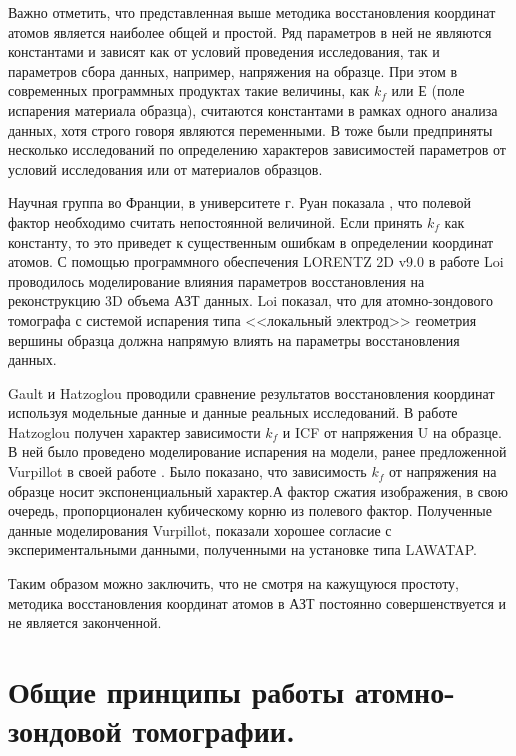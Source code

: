 Важно отметить, что представленная выше методика восстановления координат атомов является наиболее общей и простой. Ряд параметров в ней не являются константами и зависят как от условий проведения исследования, так и параметров сбора данных, например, напряжения на образце. При этом в современных программных продуктах такие величины, как $k_f$ или Е (поле испарения материала образца), считаются константами в рамках одного анализа данных, хотя строго говоря являются переменными. В тоже были предприняты несколько исследований по определению характеров зависимостей параметров от условий исследования или от материалов образцов.

Научная группа во Франции, в университете г. Руан показала \cite{Gault11_Loi}, что полевой фактор необходимо считать непостоянной величиной. Если принять $k_f$ как константу, то это приведет к существенным ошибкам в определении координат атомов. С помощью программного обеспечения LORENTZ 2D v9.0 \cite{Asi02} в работе Loi \cite{Loi13} проводилось моделирование влияния параметров восстановления на реконструкцию 3D объема АЗТ данных. Loi показал, что для атомно-зондового томографа с системой испарения типа <<локальный электрод>> геометрия вершины образца должна напрямую влиять на параметры восстановления данных.

Gault \cite{Gault11_Loi} и Hatzoglou \cite{Hatzoglou19} проводили сравнение результатов восстановления координат используя модельные данные и данные реальных исследований. В работе Hatzoglou \cite{Hatzoglou19} получен характер зависимости $k_f$ и ICF от напряжения U на образце. В ней было проведено моделирование испарения на модели, ранее предложенной Vurpillot в своей работе \cite{Vurpillot13}. Было показано, что зависимость $k_f$ от напряжения на образце носит экспоненциальный характер.А фактор сжатия изображения, в свою очередь, пропорционален кубическому корню из полевого фактор. Полученные данные моделирования Vurpillot, показали хорошее согласие с экспериментальными данными, полученными на установке типа LAWATAP.

Таким образом можно заключить, что не смотря на кажущуюся простоту, методика восстановления координат атомов в АЗТ постоянно совершенствуется и не является законченной. 


\FloatBarrier

\section{Общие принципы работы атомно-зондовой томографии.}\label{sec:ch1/sec4}

